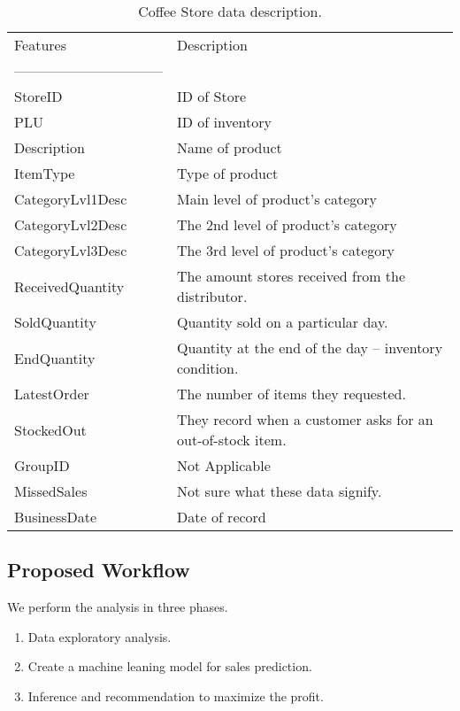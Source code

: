 \begin{table}[h!]
\centering
\begin{tabular}{p{}p{}}

 Features & Description \\ 
 -------------------------------- \\
 StoreID & ID of Store \\
 PLU & ID of inventory \\
 Description & Name of product \\
ItemType & Type of product \\
CategoryLvl1Desc & Main level of product’s category \\
CategoryLvl2Desc & The 2nd level of product’s category \\
CategoryLvl3Desc & The 3rd level of product’s category \\
ReceivedQuantity & The amount stores received from the distributor. \\
SoldQuantity & Quantity sold on a particular day. \\
EndQuantity & Quantity at the end of the day – inventory condition. \\
LatestOrder & The number of items they requested. \\
StockedOut & They record when a customer asks for an out-of-stock item. \\
GroupID & Not Applicable \\
MissedSales & Not sure what these data signify. \\
BusinessDate & Date of record \\ [1ex] 
\end{tabular}
\caption{Coffee Store data description.}
\end{table}

\newpage
\subsection{Proposed Workflow}
We perform the analysis in three phases. 
\begin{enumerate}
  \item Data exploratory analysis.
  \item Create a machine leaning model for sales prediction.
  \item Inference and recommendation to maximize the profit.
\end{enumerate}

